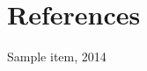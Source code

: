 \section{References}

\begingroup
\renewcommand{\section}[2]{}%

\begin{thebibliography}{99}

		Sample item, 2014

\end{thebibliography}

\endgroup